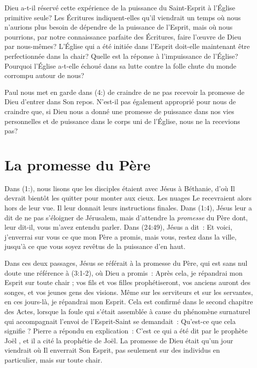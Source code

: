 Dieu a-t-il réservé cette expérience de la puissance du Saint-Esprit à
 l'Église primitive seule? Les Écritures indiquent-elles qu'il viendrait
 un temps où nous n'aurions plus besoin de dépendre de la puissance
 de l'Esprit, mais où nous pourrions, par notre connaissance parfaite
 des Écritures, faire l'œuvre de Dieu par nous-mêmes? L'Église qui a été
 initiée dans l'Esprit doit-elle maintenant être perfectionnée dans
 la chair?
 Quelle est la réponse à l'impuissance de l'Église?
 Pourquoi l'Église a-t-elle échoué dans sa lutte contre la folle chute
 du monde corrompu autour de nous?

Paul nous met en garde dans (4:) de craindre de ne pas
 recevoir la promesse de Dieu d'entrer dans Son repos.
 N'est-il pas également approprié pour nous de craindre que, si Dieu
 nous a donné une promesse de puissance dans nos vies personnelles et de
 puissance dans le corps uni de l'Église, nous ne la recevions pas?


\section*{La promesse du Père}

Dans (1:), nous lisons que les disciples étaient avec
 Jésus à Béthanie, d'où Il devrait bientôt les quitter pour monter
 aux cieux.
 Les nuages Le recevraient alors hors de leur vue.
 Il leur donnait leurs instructions finales.
 Dans (1:4), Jésus leur a dit de \og ne pas s'éloigner
 de Jérusalem, mais d'attendre la \emph{promesse} du Père dont, leur dit-il,
 vous m'avez entendu parler. \fg{}
 Dans (24:49), Jésus a dit~:
 \og Et voici, j'enverrai sur vous ce que mon Père a promis, mais vous,
 restez dans la ville, jusqu'à ce que vous soyez revêtus de la puissance
 d'en haut.\fg{}

Dans ces deux passages, Jésus se référait à la promesse du Père, qui est
 sans nul doute une référence à (3:1-2), où Dieu a promis~:
 \og Après cela, je répandrai mon Esprit sur toute chair ;
 vos fils et vos filles prophétiseront, vos anciens auront des songes,
 et vos jeunes gens des visions.
 Même sur les serviteurs et sur les servantes,
 en ces jours-là, je répandrai mon Esprit. \fg{}
 Cela est confirmé dans le second chapitre des Actes, lorsque la foule qui
 s'était assemblée à cause du phénomène surnaturel qui accompagnait l'envoi
 de l'Esprit-Saint se demandait~:
 \og Qu'est-ce que cela signifie ? \fg{}
 Pierre a répondu en explication~:
 \og C'est ce qui a été dit par le prophète Joël \fg{},
 et il a cité la prophétie de Joël.
 La promesse de Dieu était qu'un jour viendrait où Il enverrait Son Esprit,
 pas seulement sur des individus en particulier, mais sur toute chair.

